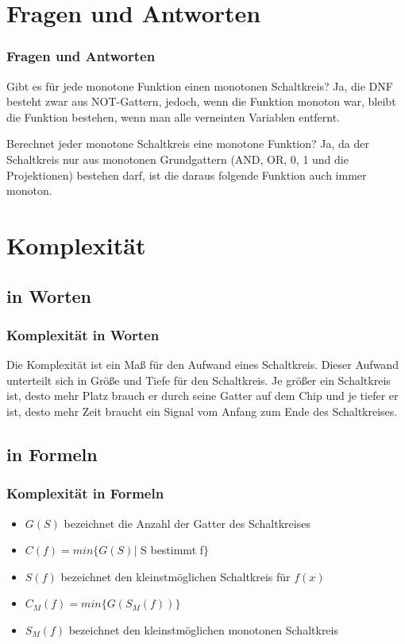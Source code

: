 \documentclass[hyperref={pdfpagelabels=false}]{beamer} %
\begin{document}
  \section{Fragen und Antworten}
  \begin{frame}%
    \frametitle{Fragen und Antworten}
    \begin{block}{Gibt es für jede monotone Funktion einen monotonen Schaltkreis?}
      Ja, die DNF besteht zwar aus NOT-Gattern, jedoch, wenn die Funktion monoton war, bleibt die Funktion bestehen, wenn man alle verneinten Variablen entfernt.
    \end{block}
    \begin{block}{Berechnet jeder monotone Schaltkreis eine monotone Funktion?}
      Ja, da der Schaltkreis nur aus monotonen Grundgattern (AND, OR, 0, 1 und die Projektionen) bestehen darf, ist die daraus folgende Funktion auch immer monoton.
    \end{block}
  \end{frame}


  \section{Komplexität}
  \subsection*{in Worten}
    \begin{frame}%
    \frametitle{Komplexität in Worten}
    Die Komplexität ist ein Maß für den Aufwand eines Schaltkreis.
    Dieser Aufwand unterteilt sich in Grö\ss{}e und Tiefe f\"ur den Schaltkreis.
    Je grö\ss{}er ein Schaltkreis ist, desto mehr Platz brauch er durch seine Gatter auf dem Chip und je tiefer er ist, desto mehr Zeit braucht ein Signal vom Anfang zum Ende des Schaltkreises.
  \end{frame}

  \subsection*{in Formeln}
  \begin{frame}
    \frametitle{Komplexität in Formeln}
    \begin{itemize}
      \item $G(S)$ bezeichnet die Anzahl der Gatter des Schaltkreises
      \item $C(f) = min \{G(S) |$ S bestimmt f$\}$
      \item $S(f)$ bezeichnet den kleinstmöglichen Schaltkreis für $f(x)$
      \item $C_M(f) = min \{G(S_M(f))\}$
      \item $S_M(f)$ bezeichnet den kleinstmöglichen monotonen Schaltkreis
    \end{itemize}
  \end{frame}
\end{document}
